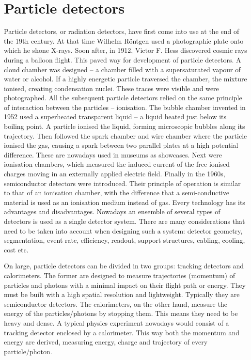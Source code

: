 \documentclass[twoside,12pt]{packages/mytustyle}  %
\begin{document}
\section{Particle detectors}
Particle detectors, or radiation detectors, have first come into use at the end of the 19th century. At that time Wilhelm R\"ontgen used a photographic plate onto which he shone X-rays. Soon after, in 1912, Victor F. Hess discovered cosmic rays during a balloon flight. This paved way for development of particle detectors. A cloud chamber was designed -- a chamber filled with a supersaturated vapour of water or alcohol. If a highly energetic particle traversed the chamber, the mixture ionised, creating condensation nuclei. These traces were visible and were photographed. All the subsequent particle detectors relied on the same principle of interaction between the particles -- ionisation. The bubble chamber invented in 1952 used a superheated transparent liquid -- a liquid heated just below its boiling point. A particle ionised the liquid, forming microscopic bubbles along its trajectory. Then followed the spark chamber and wire chamber where the particle ionised the gas, causing a spark between two parallel plates at a high potential difference. These are nowadays used in museums as showcases. Next were ionisation chambers, which measured the induced current of the free ionised charges moving in an externally applied electric field. Finally in the 1960s, semiconductor detectors were introduced. Their principle of operation is similar to that of an ionisation chamber, with the difference that a semi-conductive material is used as an ionisation medium instead of gas. Every technology has its advantages and disadvantages. Nowadays an ensemble of several types of detectors is used as a single detector system. There are many considerations that need to be taken into account when designing such a system: detector geometry, segmentation, event rate, efficiency, readout, support structures, cabling, cooling, cost etc.

On large, particle detectors can be divided in two groups: tracking detectors and calorimeters. The former are designed to measure trajectories (momentum) of particles and photons with a minimal impact on their flight path or energy. They must be built with a high spatial resolution and lightweight. Typically they are semiconductor detectors. The calorimeters, on the other hand, measure the energy of the particles/photons by stopping them. This means they need to be heavy and dense. A typical physics experiment nowadays would consist of a tracking detector enclosed by a calorimeter. This way both the momentum and energy are derived, measuring energy, charge and trajectory of every particle/photon.
\end{document}
